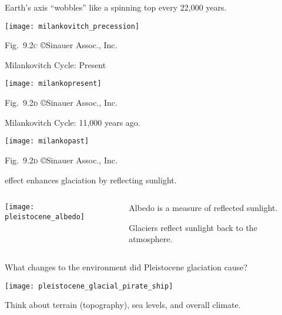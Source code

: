 \documentclass[t]{beamer}
\begin{document}
\begin{frame}{ Earth’s axis “wobbles” like a spinning top every 22,000 years.}

	{\centering
		\texttt{[image: milankovitch\_precession]}\par
	}

	\vfilll

	\hfill \tiny Fig.~9.2\textsc{c} \copyright Sinauer Assoc., Inc.
\end{frame}

\begin{frame}{Milankovitch Cycle: Present}

	{\centering
		\texttt{[image: milankopresent]}\par
	}

	\vfilll
	
	\hfill \tiny Fig.~9.2\textsc{d} \copyright Sinauer Assoc., Inc.
\end{frame}

\begin{frame}{Milankovitch Cycle: 11,000 years ago.}

	{\centering
		\texttt{[image: milankopast]}\par
	}

	\vfilll

	\hfill \tiny Fig.~9.2\textsc{d} \copyright Sinauer Assoc., Inc.

\end{frame}

\begin{frame}{ effect enhances glaciation by reflecting sunlight.}
	\begin{columns}[T]
		\begin{column}{0.5\textwidth}
			\begin{center}
				\texttt{[image: pleistocene\_albedo]}
			\end{center}
		\end{column}
		\begin{column}{0.45\textwidth}
			\hangpara Albedo is a measure of reflected sunlight. 
			
			\hangpara Glaciers reflect sunlight back to the atmosphere. 
		\end{column}
	\end{columns}
\end{frame}

\begin{frame}{What changes to the environment did Pleistocene glaciation cause? }
		\vspace{-\baselineskip}
		\begin{center}
			\texttt{[image: pleistocene\_glacial\_pirate\_ship]}
		\end{center}
		\vspace{-\baselineskip}
		\qquad Think about terrain (topography), sea levels, and overall climate.
\end{frame}
\end{document}
